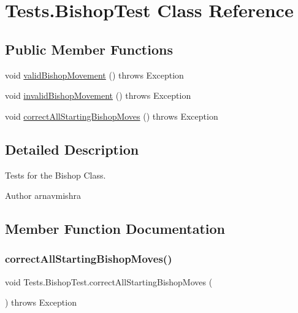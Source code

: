 \hypertarget{class_tests_1_1_bishop_test}{}\section{Tests.\+Bishop\+Test Class Reference}
\label{class_tests_1_1_bishop_test}
\subsection*{Public Member Functions}
\begin{DoxyCompactItemize}
\item 
void \hyperlink{class_tests_1_1_bishop_test_a5966af2d7a4cf4409a7c9e04e14be402}{valid\+Bishop\+Movement} ()  throws Exception 
\item 
void \hyperlink{class_tests_1_1_bishop_test_a3f1b2164ce04847f236b47960a2d6507}{invalid\+Bishop\+Movement} ()  throws Exception 
\item 
void \hyperlink{class_tests_1_1_bishop_test_a1635821930e814400c61693e0e65150c}{correct\+All\+Starting\+Bishop\+Moves} ()  throws Exception 
\end{DoxyCompactItemize}


\subsection{Detailed Description}
Tests for the Bishop Class. \begin{DoxyAuthor}{Author}
arnavmishra 
\end{DoxyAuthor}


\subsection{Member Function Documentation}
\hypertarget{class_tests_1_1_bishop_test_a1635821930e814400c61693e0e65150c}{}\label{class_tests_1_1_bishop_test_a1635821930e814400c61693e0e65150c} 
\subsubsection{\texorpdfstring{correct\+All\+Starting\+Bishop\+Moves()}{correctAllStartingBishopMoves()}}
{\footnotesize\ttfamily void Tests.\+Bishop\+Test.\+correct\+All\+Starting\+Bishop\+Moves (\begin{DoxyParamCaption}{ }\end{DoxyParamCaption}) throws Exception}

